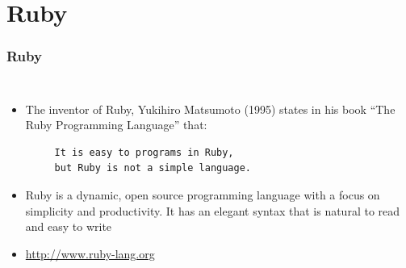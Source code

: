 \documentclass{beamer}
\begin{document}
\section{Ruby}
\begin{frame}[fragile]
\frametitle{Ruby}
\begin{columns}
 \begin{itemize}
  \item The inventor of Ruby, Yukihiro Matsumoto (1995) states in his book ``The Ruby Programming Language'' that:
  \begin{verbatim}
     It is easy to programs in Ruby,
     but Ruby is not a simple language.
  \end{verbatim} 
  \item Ruby is a dynamic, open source programming language with a focus on simplicity and productivity. It has an elegant syntax that is natural to read and easy to write

  \item \url{http://www.ruby-lang.org}
 \end{itemize}

\end{columns}

\end{frame}
\end{document}
